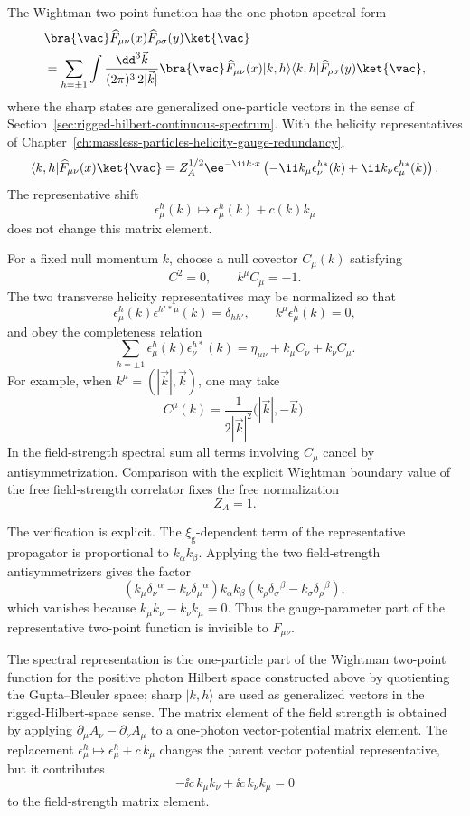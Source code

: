The Wightman two-point function has the one-photon spectral form
\[
\begin{aligned}
  &\bra{\vac}
  \widehat F_{\mu\nu}(x)\widehat F_{\rho\sigma}(y)
  \ket{\vac}  \\
  &=
  \sum_{h=\pm1}
  \int
  \frac{\dd^3\vec k}{(2\pi)^3\,2|\vec k|}
  \bra{\vac}\widehat F_{\mu\nu}(x)|k,h\rangle
  \langle k,h|\widehat F_{\rho\sigma}(y)\ket{\vac} ,
\end{aligned}
\]
where the sharp states are generalized one-particle vectors in the sense of
Section~\ref{sec:rigged-hilbert-continuous-spectrum}. With the helicity
representatives of
Chapter~\ref{ch:massless-particles-helicity-gauge-redundancy},
\[
  \langle k,h|\widehat F_{\mu\nu}(x)\ket{\vac}
  =
  Z_A^{1/2}\ee^{-\ii k\cdot x}
  \left(
    -\ii k_\mu\epsilon_\nu^{h*}(k)
    +\ii k_\nu\epsilon_\mu^{h*}(k)
  \right).
\]
The representative shift
\[
  \epsilon_\mu^h(k)\longmapsto \epsilon_\mu^h(k)+c(k)k_\mu
\]
does not change this matrix element.

For a fixed null momentum \(k\), choose a null covector \(C_\mu(k)\) satisfying
\[
  C^2=0,
  \qquad
  k^\mu C_\mu=-1.
\]
The two transverse helicity representatives may be normalized so that
\[
  \epsilon_\mu^h(k)\epsilon^{h'*\mu}(k)=\delta_{hh'},
  \qquad
  k^\mu\epsilon_\mu^h(k)=0,
\]
and obey the completeness relation
\[
  \sum_{h=\pm1}
  \epsilon_\mu^h(k)\epsilon_\nu^{h*}(k)
  =
  \eta_{\mu\nu}+k_\mu C_\nu+k_\nu C_\mu .
\]
For example, when \(k^\mu=(|\vec k|,\vec k)\), one may take
\[
  C^\mu(k)
  =
  \frac{1}{2|\vec k|^2}\bigl(|\vec k|,-\vec k\bigr).
\]
In the field-strength spectral sum all terms involving \(C_\mu\) cancel by
antisymmetrization. Comparison with the explicit Wightman boundary value of
the free field-strength correlator fixes the free normalization
\[
  Z_A=1.
\]

The verification is explicit.
The \(\xi_{\mathrm g}\)-dependent term of the representative propagator is
proportional to \(k_\alpha k_\beta\).  Applying the two field-strength
antisymmetrizers gives the factor
\[
  (k_\mu\delta_\nu{}^\alpha-k_\nu\delta_\mu{}^\alpha)
  k_\alpha k_\beta
  (k_\rho\delta_\sigma{}^\beta-k_\sigma\delta_\rho{}^\beta),
\]
which vanishes because \(k_\mu k_\nu-k_\nu k_\mu=0\).  Thus the
gauge-parameter part of the representative two-point function is invisible
to \(F_{\mu\nu}\).

The spectral representation is the one-particle part of the Wightman
two-point function for the positive photon Hilbert space constructed above by
quotienting the Gupta--Bleuler space; sharp \(|k,h\rangle\) are used as
generalized vectors in the rigged-Hilbert-space sense.  The matrix element of
the field strength is obtained by applying
\(\partial_\mu A_\nu-\partial_\nu A_\mu\) to a one-photon vector-potential
matrix element.  The replacement
\(\epsilon_\mu^h\mapsto\epsilon_\mu^h+c\,k_\mu\) changes the parent vector
potential representative, but it contributes
\[
  -\ii c\,k_\mu k_\nu+\ii c\,k_\nu k_\mu=0
\]
to the field-strength matrix element.

